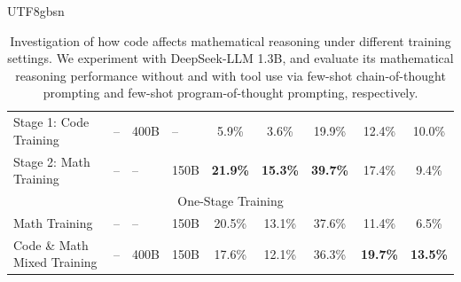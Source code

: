 \documentclass[11pt, a4paper, logo, copyright, nonumbering]{deepseek}
\begin{document}
\begin{CJK*}{UTF8}{gbsn}
\begin{table}[t!]
{\begin{tabular}{llllccccc}
\midrule
Stage 1: Code Training    & --                              & 400B                         & --                           & 5.9\%  & 3.6\%  & 19.9\%         & 12.4\%        & 10.0\%             \\
Stage 2: Math Training    & --                              & --                           & 150B                         & \textbf{21.9\%}  &  \textbf{15.3\%}  & \textbf{39.7\%}         & 17.4\%       & 9.4\%             \\ 
\midrule
\midrule
\multicolumn{9}{c}{One-Stage Training}                                                                                                                                                          \\ 
\midrule
Math Training             & --                              & --                           & 150B                         & 20.5\% & 13.1\% & 37.6\%         & 11.4\%       & 6.5\%             \\
\midrule
Code \& Math Mixed Training & --                              & 400B                         & 150B                         &     17.6\%   &   12.1\%     &    36.3\%            &      \textbf{19.7\%}      &    \textbf{13.5\%}            \\
\bottomrule
\end{tabular}
    }
    \caption{
    Investigation of how code affects mathematical reasoning under different training settings.
    We experiment with DeepSeek-LLM 1.3B, and evaluate its mathematical reasoning performance without and with tool use via few-shot chain-of-thought prompting and few-shot program-of-thought prompting, respectively.
    }
    \label{tab:code-math}
\end{table}
\endgroup


\end{CJK*}
\end{document}
